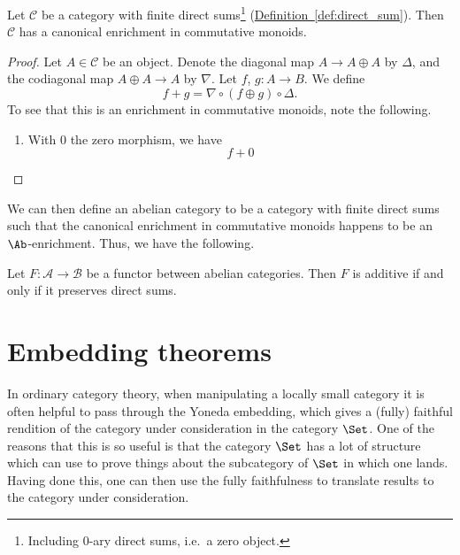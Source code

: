 \documentclass[main.tex]{subfiles}
\begin{document}
\begin{proposition}
  Let $\mathcal{C}$ be a category with finite direct sums\footnote{Including 0-ary direct sums, i.e.\ a zero object.} (\hyperref[def:direct_sum]{Definition~\ref*{def:direct_sum}}). Then $\mathcal{C}$ has a canonical enrichment in commutative monoids.
\end{proposition}
\begin{proof}
  Let $A \in \mathcal{C}$ be an object. Denote the diagonal map $A \to A \oplus A$ by $\Delta$, and the codiagonal map $A \oplus A \to A$ by $\nabla$. Let $f$, $g\colon A \to B$. We define
  \begin{equation*}
    f + g = \nabla \circ (f \oplus g) \circ \Delta.
  \end{equation*}
  To see that this is an enrichment in commutative monoids, note the following.
  \begin{enumerate}
    \item With $0$ the zero morphism, we have
      \begin{equation*}
        f + 0
      \end{equation*}
  \end{enumerate}
\end{proof}

We can then define an abelian category to be a category with finite direct sums such that the canonical enrichment in commutative monoids happens to be an \(\Ab\)-enrichment. Thus, we have the following.

\begin{corollary}
  \label{cor:functor_additive_iff_preserves_direct_sums}
  Let $F\colon \mathcal{A} \to \mathcal{B}$  be a functor between abelian categories. Then $F$ is additive if and only if it preserves direct sums.
\end{corollary}

\section{Embedding theorems}
\label{sec:embedding_theorems}

In ordinary category theory, when manipulating a locally small category it is often helpful to pass through the Yoneda embedding, which gives a (fully) faithful rendition of the category under consideration in the category $\Set$. One of the reasons that this is so useful is that the category $\Set$ has a lot of structure which can use to prove things about the subcategory of $\Set$ in which one lands. Having done this, one can then use the fully faithfulness to translate results to the category under consideration.
\end{document}
